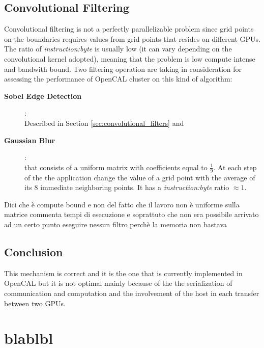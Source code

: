 \subsection{Convolutional Filtering}
Convolutional filtering is not a perfectly parallelizable problem since grid points on the boundaries requires values from grid points that resides on different GPUs. The ratio of \textit{instruction:byte} is  usually low (it can vary depending on the convolutional kernel adopted), meaning that the problem is low compute intense and bandwith bound.
Two filtering operation are taking in consideration for assessing the performance of OpenCAL cluster on this kind of algorithm:
\begin{description}
	\item[\textbf{Sobel Edge Detection}]:\\ Described in Section \ref{sec:convolutional_filters} and
	\item[\textbf{Gaussian Blur}]:\\ that consists of a  uniform matrix  with coefficients equal to $\frac{1}{9}$. At each step of the the application change the value of a grid point with the average of its $8$ immediate neighboring points. It has a \textit{instruction:byte} ratio $\approx 1$.
\end{description}

Dici che è compute bound e non del fatto che il lavoro non è uniforme sulla matrice 
commenta tempi di esecuzione e soprattuto che non era possibile arrivato ad un certo punto eseguire nessun filtro perchè la memoria non bastava


\subsection{Conclusion}
This mechanism is correct and it is the one that is currently implemented in OpenCAL but it is not optimal mainly because of the the serialization of communication and computation and the involvement of the host in each transfer between two GPUs.





\section{blablbl}